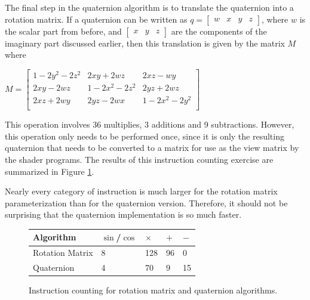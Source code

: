 \documentclass{acm_proc_article-sp}
\begin{document}
The final step in the quaternion algorithm is to translate the quaternion into a rotation matrix.
If a quaternion can be written as $q = \left[ \begin{array}{cccc} w & x & y & z \end{array} \right]$, where $w$ is the scalar part from before, and $\left[ \begin{array}{ccc} x & y & z \end{array} \right]$ are the components of the imaginary part discussed earlier, then this translation is given by the matrix $M$ where

$M = \left[ \begin{array}{ccc}
    1 - 2y^2 - 2z^2 & 2xy + 2wz & 2xz - wy \\
    2xy - 2wz & 1 - 2x^2 - 2z^2 & 2yz + 2wz \\
    2xz + 2wy & 2yz - 2wx & 1 - 2x^2 - 2y^2 \\
    \end{array}\right]$

This operation involves 36 multiplies, 3 additions and 9 subtractions.
However, this operation only needs to be performed once, since it is only the resulting quaternion that needs to be converted to a matrix for use as the view matrix by the shader programs.
The results of this instruction counting exercise are summarized in Figure \ref{fig:counting}.

Nearly every category of instruction is much larger for the rotation matrix parameterization than for the quaternion version.
Therefore, it should not be surprising that the quaternion implementation is so much faster.

\begin{figure}
\begin{framed}
\begin{tabular}{l|l|l|l|l}
    Algorithm       & $\sin$/$\cos$  & $\times$      & $+$       & $-$  \\
    \hline
    Rotation Matrix & 8              & 128           & 96        & 0             \\
    Quaternion      & 4              & 70            & 9         & 15            \\

\end{tabular}
\caption{Instruction counting for rotation matrix and quaternion algorithms.}
\end{framed}
\label{fig:counting}
\end{figure}
\end{document}
